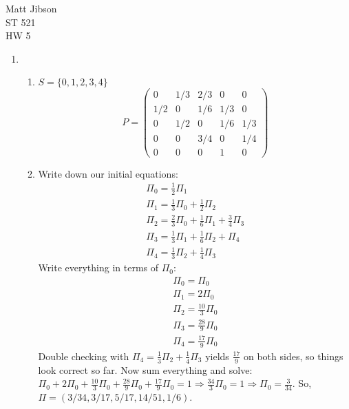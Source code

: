 \documentclass{article}
\begin{document}
\begin{flushright}
Matt Jibson \\
ST 521 \\
HW 5
\end{flushright}

\begin{enumerate}
	\item %
		\begin{enumerate}
			\item $S = \{0, 1, 2, 3, 4\}$
				\begin{displaymath}
					P = \left( \begin{array}{ccccc}
						0 & 1/3 & 2/3 & 0 & 0 \\
						1/2 & 0 & 1/6 & 1/3 & 0 \\
						0 & 1/2 & 0 & 1/6 & 1/3 \\
						0 & 0 & 3/4 & 0 & 1/4 \\
						0 & 0 & 0 & 1 & 0
					\end{array} \right)
				\end{displaymath}
			\item Write down our initial equations:
				\begin{displaymath}
					\begin{array}{l}
						\Pi_0 = \frac{1}{2} \Pi_1 \\
						\Pi_1 = \frac{1}{3} \Pi_0 + \frac{1}{2} \Pi_2 \\
						\Pi_2 = \frac{2}{3} \Pi_0 + \frac{1}{6} \Pi_1 + \frac{3}{4} \Pi_3 \\
						\Pi_3 = \frac{1}{3} \Pi_1 + \frac{1}{6} \Pi_2 + \Pi_4 \\
						\Pi_4 = \frac{1}{3} \Pi_2 + \frac{1}{4} \Pi_3
					\end{array}
				\end{displaymath}
				Write everything in terms of $\Pi_0$:
				\begin{displaymath}
					\begin{array}{l}
						\Pi_0 = \Pi_0 \\
						\Pi_1 = 2 \Pi_0 \\
						\Pi_2 = \frac{10}{3} \Pi_0 \\
						\Pi_3 = \frac{28}{9} \Pi_0 \\
						\Pi_4 = \frac{17}{9} \Pi_0
					\end{array}
				\end{displaymath}
				Double checking with $\Pi_4 = \frac{1}{3} \Pi_2 + \frac{1}{4} \Pi_3$ yields $\frac{17}{9}$ on both sides, so things look correct so far. Now sum everything and solve: $\Pi_0 + 2 \Pi_0 + \frac{10}{3} \Pi_0 + \frac{28}{9} \Pi_0 + \frac{17}{9} \Pi_0 = 1 \Rightarrow \frac{34}{3} \Pi_0 = 1 \Rightarrow \Pi_0 = \frac{3}{34}$. So, $\Pi = (3/34, 3/17, 5/17, 14/51, 1/6)$.

\end{enumerate}
\end{enumerate}
\end{document}
